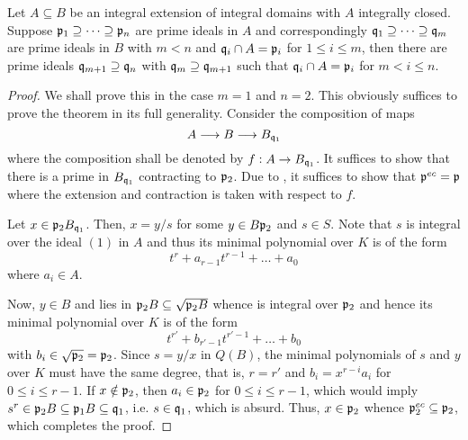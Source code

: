 \begin{theorem}
    Let $A\subseteq B$ be an integral extension of integral domains with $A$ integrally closed. Suppose $\mathfrak p_1\supseteq\dots\supseteq\mathfrak p_n$ are prime ideals in $A$ and correspondingly $\mathfrak q_1\supseteq\dots\supseteq\mathfrak q_m$ are prime ideals in $B$ with $m < n$ and $\mathfrak q_i\cap A = \mathfrak p_i$ for $1\le i\le m$, then there are prime ideals $\mathfrak q_{m + 1}\supseteq\mathfrak q_{n}$ with $\mathfrak q_m\supseteq\mathfrak q_{m + 1}$ such that $\mathfrak q_i\cap A = \mathfrak p_i$ for $m < i\le n$.
\end{theorem}
\begin{proof}
    We shall prove this in the case $m = 1$ and $n = 2$. This obviously suffices to prove the theorem in its full generality. Consider the composition of maps 
    \begin{equation*}
        A\longrightarrow B\longrightarrow B_{\mathfrak q_1}
    \end{equation*}
    where the composition shall be denoted by $f: A\to B_{\mathfrak q_1}$. It suffices to show that there is a prime in $B_{\mathfrak q_1}$ contracting to $\mathfrak p_2$. Due to , it suffices to show that $\mathfrak p^{ec} = \mathfrak p$ where the extension and contraction is taken with respect to $f$.

    Let $x\in\mathfrak p_2 B_{\mathfrak q_1}$. Then, $x = y/s$ for some $y\in B\mathfrak p_2$ and $s\in S$. Note that $s$ is integral over the ideal $(1)$ in $A$ and thus its minimal polynomial over $K$ is of the form 
    \begin{equation*}
        t^r + a_{r - 1}t^{r - 1} + \dots + a_0
    \end{equation*}
    where $a_i\in A$. 
    
    Now, $y\in B$ and lies in $\mathfrak p_2B\subseteq\sqrt{\mathfrak p_2B}$ whence is integral over $\mathfrak p_2$ and hence its minimal polynomial over $K$ is of the form 
    \begin{equation*}
        t^{r'} + b_{r' - 1}t^{r' - 1} + \dots + b_0
    \end{equation*}
    with $b_i\in\sqrt{\mathfrak p_2} = \mathfrak p_2$. Since $s = y/x$ in $Q(B)$, the minimal polynomials of $s$ and $y$ over $K$ must have the same degree, that is, $r = r'$ and $b_i = x^{r - i}a_i$ for $0\le i\le r - 1$. If $x\notin\mathfrak p_2$, then $a_i\in\mathfrak p_2$ for $0\le i\le r - 1$, which would imply $s^r\in\mathfrak p_2B\subseteq\mathfrak p_1B\subseteq\mathfrak q_1$, i.e. $s\in\mathfrak q_1$, which is absurd. Thus, $x\in\mathfrak p_2$ whence $\mathfrak p_2^{ec}\subseteq\mathfrak p_2$, which completes the proof.
\end{proof}

